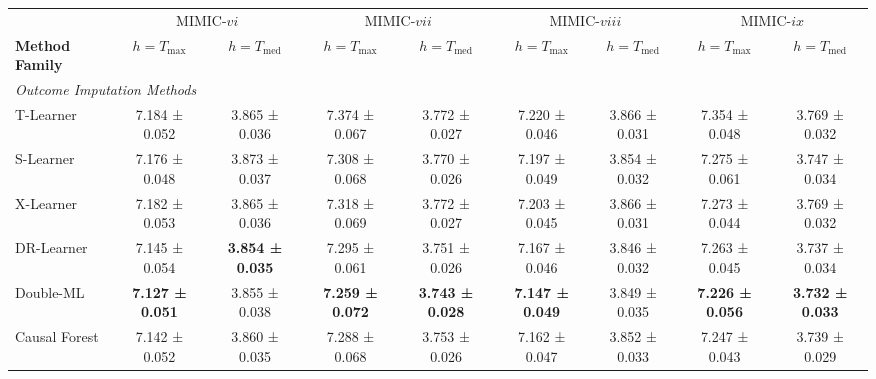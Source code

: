 \begin{table}[htbp]
{\begin{adjustbox}{angle=90,max height=0.95\textheight,center}
\begin{minipage}{\textheight}
    \par\noindent\begin{adjustbox}{max width=\linewidth}\begin{minipage}[c]{\linewidth}
    \centering
    \begin{adjustbox}{max width=\linewidth}\begin{tabular}{l cc cc cc cc}
        \toprule
        & \multicolumn{2}{c}{MIMIC-$vi$} 
        & \multicolumn{2}{c}{MIMIC-$vii$}
        & \multicolumn{2}{c}{MIMIC-$viii$}
        & \multicolumn{2}{c}{MIMIC-$ix$} \\
        \cmidrule(lr){2-3}
        \cmidrule(lr){4-5}
        \cmidrule(lr){6-7}
        \cmidrule(lr){8-9}
        \textbf{Method Family} 
        & $h=T_{\max}$ & $h=T_{\text{med}}$
        & $h=T_{\max}$ & $h=T_{\text{med}}$
        & $h=T_{\max}$ & $h=T_{\text{med}}$
        & $h=T_{\max}$ & $h=T_{\text{med}}$ \\ \midrule
        \multicolumn{7}{l}{\textit{Outcome Imputation Methods}} \\
        T-Learner & 7.184 ± 0.052 & 3.865 ± 0.036 & 7.374 ± 0.067 & 3.772 ± 0.027 & 7.220 ± 0.046 & 3.866 ± 0.031 & 7.354 ± 0.048 & 3.769 ± 0.032 \\ 
        S-Learner & 7.176 ± 0.048 & 3.873 ± 0.037 & 7.308 ± 0.068 & 3.770 ± 0.026 & 7.197 ± 0.049 & 3.854 ± 0.032 & 7.275 ± 0.061 & 3.747 ± 0.034 \\ 
        X-Learner & 7.182 ± 0.053 & 3.865 ± 0.036 & 7.318 ± 0.069 & 3.772 ± 0.027 & 7.203 ± 0.045 & 3.866 ± 0.031 & 7.273 ± 0.044 & 3.769 ± 0.032 \\ 
        DR-Learner & 7.145 ± 0.054 & \textbf{3.854 ± 0.035} & 7.295 ± 0.061 & 3.751 ± 0.026 & 7.167 ± 0.046 & 3.846 ± 0.032 & 7.263 ± 0.045 & 3.737 ± 0.034 \\
        Double-ML & \textbf{7.127 ± 0.051} & 3.855 ± 0.038 & \textbf{7.259 ± 0.072} & \textbf{3.743 ± 0.028} & \textbf{7.147 ± 0.049} & 3.849 ± 0.035 & \textbf{7.226 ± 0.056} & \textbf{3.732 ± 0.033} \\
        Causal Forest & 7.142 ± 0.052 & 3.860 ± 0.035 & 7.288 ± 0.068 & 3.753 ± 0.026 & 7.162 ± 0.047 & 3.852 ± 0.033 & 7.247 ± 0.043 & 3.739 ± 0.029 \\ 

\end{tabular}
\end{adjustbox}
\end{minipage}
\end{adjustbox}
\end{minipage}
\end{adjustbox}}
\end{table}
